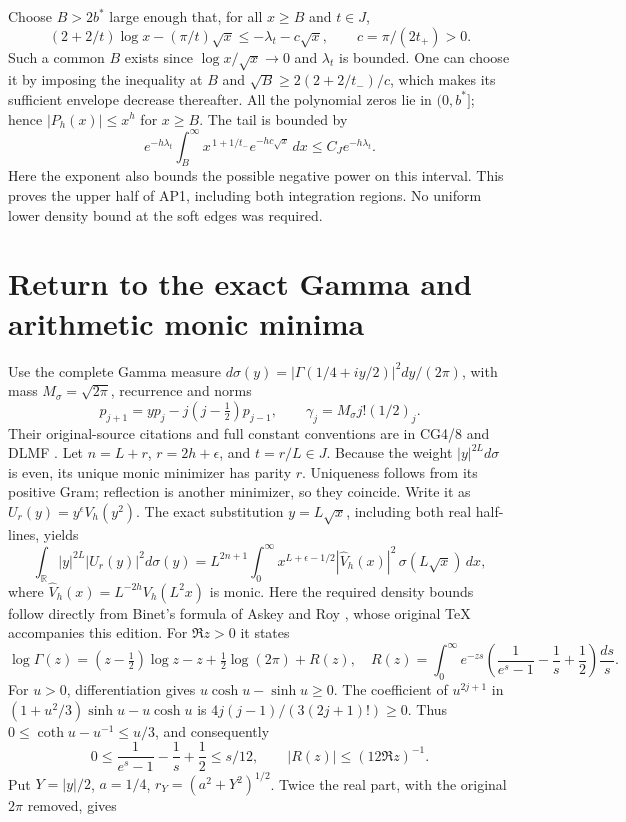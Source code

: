 \documentclass[11pt]{article}
\begin{document}
Choose \(B>2b^*\) large enough that, for all \(x\ge B\) and \(t\in J\),
\[
(2+2/t)\log x-(\pi/t)\sqrt x
\le-\lambda_t-c\sqrt x,\qquad c=\pi/(2t_+)>0 .
\]
Such a common \(B\) exists since \(\log x/\sqrt x\to0\) and
\(\lambda_t\) is bounded. One can choose it by imposing the
inequality at \(B\) and
\(\sqrt B\ge 2(2+2/t_-)/c\), which makes its sufficient envelope
decrease thereafter. All the polynomial zeros lie in \((0,b^*]\);
hence \(|P_h(x)|\le x^h\) for \(x\ge B\).
The tail is bounded by
\[
e^{-h\lambda_t}\int_B^\infty
 x^{\,1+1/t_-}e^{-hc\sqrt x}\,dx
\le C_Je^{-h\lambda_t}.
\]
Here the exponent also bounds the possible negative power on this
interval. This proves the upper half of AP1, including both
integration regions. No uniform lower density bound at the soft
edges was required.

\section{Return to the exact Gamma and arithmetic monic minima}
Use the complete Gamma measure
\(d\sigma(y)=|\Gamma(1/4+iy/2)|^2dy/(2\pi)\),
with mass \(M_\sigma=\sqrt{2\pi}\), recurrence and norms
\[
p_{j+1}=yp_j-j(j-\tfrac12)p_{j-1},\qquad
\gamma_j=M_\sigma j!(1/2)_j .
\]
Their original-source citations and full constant conventions are
in CG4/8 and DLMF \cite{APCG,APDLMF}.
Let \(n=L+r\), \(r=2h+\epsilon\), and \(t=r/L\in J\).
Because the weight \(|y|^{2L}d\sigma\) is even, its unique monic
minimizer has parity \(r\). Uniqueness follows from its positive
Gram; reflection is another minimizer, so they coincide.
Write it as \(U_r(y)=y^\epsilon V_h(y^2)\).
The exact substitution \(y=L\sqrt x\), including both real
half-lines, yields
\[
\int_{\mathbb R}|y|^{2L}|U_r(y)|^2d\sigma(y)
=L^{2n+1}\int_0^\infty x^{L+\epsilon-1/2}
 |\widehat V_h(x)|^2\,\sigma(L\sqrt x)\,dx,
\]
where \(\widehat V_h(x)=L^{-2h}V_h(L^2x)\) is monic.
Here the required density bounds follow directly from Binet's formula
of Askey and Roy \cite{APBinet}, whose original TeX accompanies this edition.
For $\Re z>0$ it states
\[
\log\Gamma(z)=(z-\tfrac12)\log z-z+\tfrac12\log(2\pi)+R(z),\quad
R(z)=\int_0^\infty e^{-zs}
\left(\frac1{e^s-1}-\frac1s+\frac12\right)\frac{ds}{s}.
\]
For $u>0$, differentiation gives $u\cosh u-\sinh u\ge0$.
The coefficient of $u^{2j+1}$ in
$(1+u^2/3)\sinh u-u\cosh u$ is
$4j(j-1)/(3(2j+1)!)\ge0$. Thus
$0\le\coth u-u^{-1}\le u/3$, and consequently
\[
0\le\frac1{e^s-1}-\frac1s+\frac12\le s/12,\qquad
|R(z)|\le(12\Re z)^{-1}.
\]
Put $Y=|y|/2$, $a=1/4$, $r_Y=(a^2+Y^2)^{1/2}$.
Twice the real part, with the original $2\pi$ removed, gives
\end{document}
